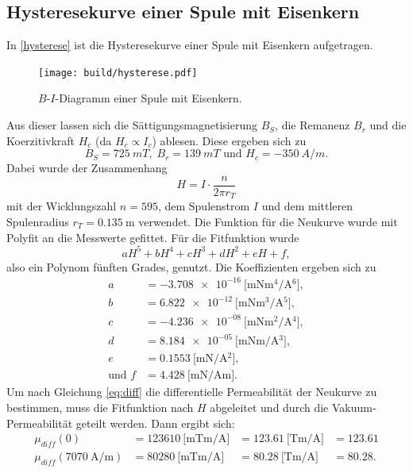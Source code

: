\subsection{Hysteresekurve einer Spule mit Eisenkern}
In \autoref{hysterese} ist die Hysteresekurve einer Spule mit Eisenkern aufgetragen.
\begin{figure}[H]
    \texttt{[image: build/hysterese.pdf]}
    \caption{$B$-$I$-Diagramm einer Spule mit Eisenkern.}
    \label{hysterese}
\end{figure}
Aus dieser lassen sich die Sättigungsmagnetisierung $B_S$, die Remanenz $B_r$ und
die Koerzitivkraft $H_c$ (da $H_c \propto I_c$) ablesen. Diese ergeben sich zu 
\begin{equation*}
    B_S = \SI{725}{mT},\;B_r = \SI{139}{mT} \text{ und } H_c = \SI{-350}{A/m}.
\end{equation*}
Dabei wurde der Zusammenhang 
\begin{equation*}
    H = I \cdot \frac{n}{2\pi r_T}
\end{equation*}
mit der Wicklungszahl $n = 595$, dem Spulenstrom $I$ und dem mittleren Spulenradius $r_T = \SI{0.135}{\meter}$ verwendet.
Die Funktion für die Neukurve wurde mit Polyfit \cite{scipy} an die Messwerte gefittet. Für die Fitfunktion wurde 
\begin{equation*}
    aH^5 + bH^4 + cH^3 + dH^2 + eH + f,
\end{equation*}
also ein Polynom fünften Grades, genutzt.
Die Koeffizienten ergeben sich zu
\begin{align*}
    a &= \SI{-3.708e-16}{[\milli\newton\m^4\per\A^6]},\\
    b &= \SI{6.822e-12}{[\milli\newton\m^3\per\A^5]},\\
    c &= \SI{-4.236e-08}{[\milli\newton\m^2\per\A^4]},\\
    d &= \SI{8.184e-05}{[\milli\newton\m\per\A^3]},\\
    e &= \SI{0.1553}{[\milli\newton\per\A^2]},\\
    \text{und }f &= \SI{4.428}{[\milli\newton\per\A\m]}.
\end{align*}
Um nach Gleichung \eqref{eq:diff} die differentielle Permeabilität der Neukurve zu bestimmen, muss die Fitfunktion nach $H$ abgeleitet und durch die Vakuum-Permeabilität 
geteilt werden. Dann ergibt sich:
\begin{align}\label{mudiff}
    \mu_{diff}(0)    &= \SI{123610}{[\milli\tesla\meter\per\ampere]} &= \SI{123.61}{[\tesla\meter\per\ampere]} &= 123.61 \\
    \mu_{diff}(\SI{7070}{\ampere\per\meter}) &= \SI{80280}{[\milli\tesla\meter\per\ampere]} &= \SI{80.28}{[\tesla\meter\per\ampere]} &= 80.28.
\end{align}













\newpage